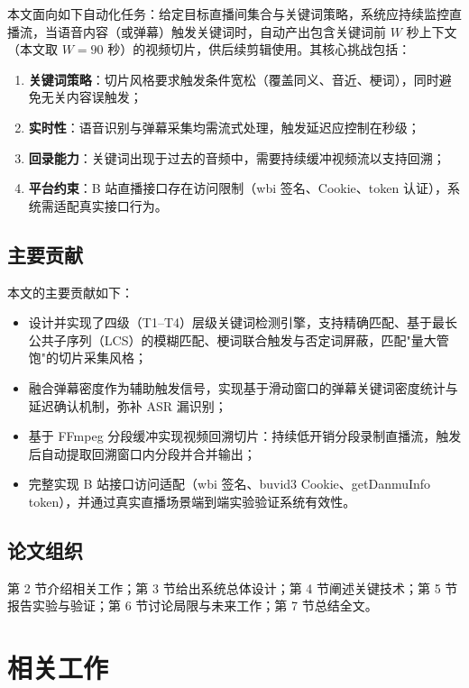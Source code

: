 \documentclass[UTF8,11pt,a4paper]{ctexart}
\begin{document}
本文面向如下自动化任务：给定目标直播间集合与关键词策略，系统应持续监控直播流，当语音内容（或弹幕）触发关键词时，自动产出包含关键词前 $W$ 秒上下文（本文取 $W=90$ 秒）的视频切片，供后续剪辑使用。其核心挑战包括：

\begin{enumerate}
\item \textbf{关键词策略}：切片风格要求触发条件宽松（覆盖同义、音近、梗词），同时避免无关内容误触发；
\item \textbf{实时性}：语音识别与弹幕采集均需流式处理，触发延迟应控制在秒级；
\item \textbf{回录能力}：关键词出现于过去的音频中，需要持续缓冲视频流以支持回溯；
\item \textbf{平台约束}：B 站直播接口存在访问限制（wbi 签名、Cookie、token 认证），系统需适配真实接口行为。
\end{enumerate}

\subsection{主要贡献}

本文的主要贡献如下：

\begin{itemize}
\item 设计并实现了四级（T1--T4）层级关键词检测引擎，支持精确匹配、基于最长公共子序列（LCS）的模糊匹配、梗词联合触发与否定词屏蔽，匹配"量大管饱"的切片采集风格；
\item 融合弹幕密度作为辅助触发信号，实现基于滑动窗口的弹幕关键词密度统计与延迟确认机制，弥补 ASR 漏识别；
\item 基于 FFmpeg 分段缓冲实现视频回溯切片：持续低开销分段录制直播流，触发后自动提取回溯窗口内分段并合并输出；
\item 完整实现 B 站接口访问适配（wbi 签名、buvid3 Cookie、getDanmuInfo token），并通过真实直播场景端到端实验验证系统有效性。
\end{itemize}

\subsection{论文组织}

第 2 节介绍相关工作；第 3 节给出系统总体设计；第 4 节阐述关键技术；第 5 节报告实验与验证；第 6 节讨论局限与未来工作；第 7 节总结全文。

\section{相关工作}
\end{document}

